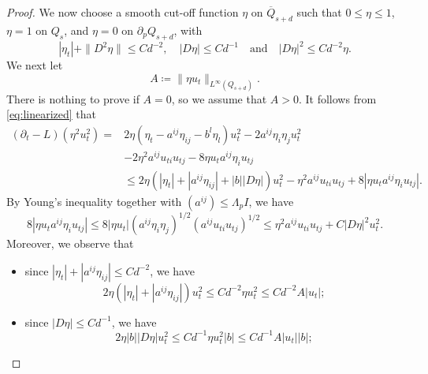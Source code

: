 \documentclass[10pt,a4paper]{amsart}
\begin{document}
\begin{proof}
We now choose a smooth cut-off function $\eta$ on $\overline{Q}_{s+d}$ such that $0\leq\eta\leq1$, $\eta=1$ on $Q_s$, and $\eta=0$ on $\partial_pQ_{s+d}$, with
\begin{equation*}
    |\eta_t|+\|D^2\eta\|\leq Cd^{-2}, \quad
    |D\eta|\leq Cd^{-1}\quad\text{and}\quad
    |D\eta|^2\leq Cd^{-2}\eta.
\end{equation*}
We next let
\begin{equation*}
 A\coloneqq\|\eta u_t\|_{L^\infty(Q_{s+d})}.
\end{equation*}
There is nothing to prove if $A=0$, so we assume that $A>0$. It follows from \eqref{eq:linearized} that
\begin{equation*}
    \begin{aligned}
        (\partial_t-L)(\eta^2u_t^2)=&2\eta(\eta_t-a^{ij}\eta_{ij}-b^l\eta_l)u_t^2
 -2a^{ij}\eta_i\eta_j u_t^2\\
 &-2\eta^2a^{ij}u_{ti}u_{tj}-8\eta u_ta^{ij}\eta_i u_{tj}\\
 &\leq 2\eta(|\eta_t|+|a^{ij}\eta_{ij}|+|b||D\eta|)u_t^2
 -\eta^2a^{ij}u_{ti}u_{tj}+8|\eta u_ta^{ij}\eta_i u_{tj}|.
    \end{aligned}
\end{equation*}
By Young's inequality together with $(a^{ij}) \leq \Lambda_pI$, we have
\begin{equation*}
 8|\eta u_ta^{ij}\eta_i u_{tj}| \leq 8|\eta u_t|(a^{ij}\eta_i\eta_j)^{1/2}(a^{ij}u_{ti}u_{tj})^{1/2}\leq \eta^2a^{ij}u_{ti}u_{tj}+C|D\eta|^2u_t^2.
\end{equation*}
Moreover, we observe that
\begin{itemize}
    \item since $|\eta_t|+|a^{ij}\eta_{ij}| \leq Cd^{-2}$, we have
    \begin{equation*}
        2\eta(|\eta_t|+|a^{ij}\eta_{ij}|)u_t^2 \leq Cd^{-2} \eta u_t^2 \leq Cd^{-2}A|u_t|;
    \end{equation*}

    \item since $|D\eta| \leq Cd^{-1}$, we have
    \begin{equation*}
        2\eta |b||D\eta|u_t^2 \leq Cd^{-1} \eta u_t^2 |b| \leq Cd^{-1} A |u_t| |b|;
    \end{equation*}


\end{itemize}
\end{proof}
\end{document}
